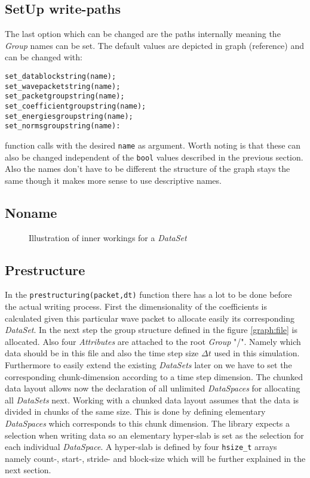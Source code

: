 \documentclass{article}
\begin{document}
\subsection{SetUp write-paths}
The last option which can be changed are the paths internally meaning the \textit{Group} names can be set. The default values are depicted in graph (reference) and can be changed with:
\begin{lstlisting}
set_datablockstring(name);
set_wavepacketstring(name);
set_packetgroupstring(name);
set_coefficientgroupstring(name);
set_energiesgroupstring(name);
set_normsgroupstring(name):
\end{lstlisting}
function calls with the desired \texttt{name} as argument. Worth noting is that these can also be changed independent of the \texttt{bool} values described in the previous section. Also the names don't have to be different the structure of the graph stays the same though it makes more sense to use descriptive names.

\subsection{Noname}
\begin{figure}[ht!]
\caption{Illustration of inner workings for a \textit{DataSet}}
\label{fig:illustration}
\end{figure}

\subsection{Prestructure}
In the \texttt{prestructuring(packet,dt)} function there has a lot to be done before the actual writing process. First the dimensionality of the coefficients is calculated given this particular wave packet to allocate easily its corresponding \textit{DataSet}. In the next step the group structure defined in the figure \ref{graph:file} is allocated. Also four \textit{Attributes} are attached to the root \textit{Group} "/". Namely which data should be in this file and also the time step size $\Delta t$ used in this simulation. Furthermore to easily extend the existing \textit{DataSets} later on we have to set the corresponding chunk-dimension according to a time step dimension. The chunked data layout allows now the declaration of all unlimited \textit{DataSpaces} for allocating all \textit{DataSets} next. Working with a chunked data layout assumes that the data is divided in chunks of the same size. This is done by defining elementary \textit{DataSpaces} which corresponds to this chunk dimension. The library expects a selection when writing data so an elementary hyper-slab is set as the selection for each individual \textit{DataSpace}. A hyper-slab is defined by four \texttt{hsize\_t} arrays namely count-, start-, stride- and block-size which will be further explained in the next section. 
\end{document}
